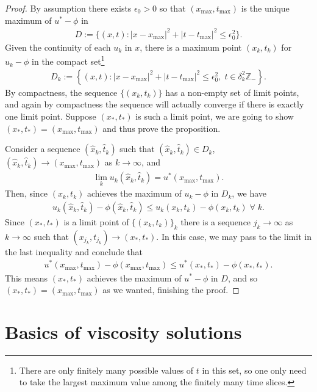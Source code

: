 \documentclass[reqno]{amsart}
\numberwithin{equation}{section}
\begin{document}
\begin{proof}
  By assumption there exists $\epsilon_0>0$ so that $(x_{\max},t_{\max})$ is the unique maximum of $u^*-\phi$ in 
  \begin{align*}
    D := \{ (x,t): |x-x_{\max}|^2+|t-t_{\max}|^2\leq \epsilon_0^2\}.    
  \end{align*} 
  Given the continuity of each $u_k$ in $x$, there is a maximum point $(x_k,t_k)$ for $u_k-\phi$ in the compact set\footnote{There are only finitely many possible values of $t$ in this set, so one only need to take the largest maximum value among the finitely many time slices.}
  \begin{align*}
    D_k:= \left \{ (x,t) : |x-x_{\text{max}}|^2+|t-t_{\text{max}}|^2 \leq \epsilon_0^2,\; t \in \delta^2_k \mathbb{Z}_- \right \}. 
  \end{align*} 
  By compactness, the sequence $\{(x_k,t_k)\}$ has a non-empty set of limit points, and again by compactness the sequence will actually converge if there is exactly one limit point. Suppose $(x_*,t_*)$ is such a limit point, we are going to show $(x_*,t_*) =  (x_{\max},t_{\max})$ and thus prove the proposition.   
  
  Consider a sequence $(\hat x_k,\hat t_k)$  such that $(\hat x_k,\hat t_k) \in D_k$, $(\hat x_k,\hat t_k) \to (x_{\max},t_{\max})$ as $k \to \infty$, and
  \begin{align*}
    \lim_ku_k(\hat x_k,\hat t_k) = u^*(x_{\max},t_{\max}).  
  \end{align*}
  Then, since $(x_k,t_k)$ achieves the maximum of $u_k-\phi$ in $D_k$, we have
  \begin{align*}
    u_k(\hat x_k,\hat t_k)-\phi(\hat x_k,\hat t_k) \leq u_k(x_k,t_k)-\phi(x_k,t_k)\;\forall\;k.  
  \end{align*}
  Since $(x_*,t_*)$ is a limit point of $\{(x_k,t_k)\}_k$ there is a sequence $j_k \to \infty$ as $k\to \infty$ such that $(x_{j_k},t_{j_k}) \to (x_{*},t_{*})$. In this case, we may pass to the limit in the last inequality and conclude that 
  \begin{align*}
    u^*(x_{\max},t_{\max})-\phi(x_{\max},t_{\max}) \leq u^*(x_{*},t_{*})-\phi(x_{*},t_{*}).    
  \end{align*}  
  This means $(x_*,t_*)$ achieves the maximum of $u^*-\phi$ in $D$, and so $(x_{*},t_{*}) = (x_{\max},t_{\max})$ as we wanted, finishing the proof. 

\end{proof}
\section{Basics of viscosity solutions}\label{a:basics of viscosity solutions}
\end{document}
